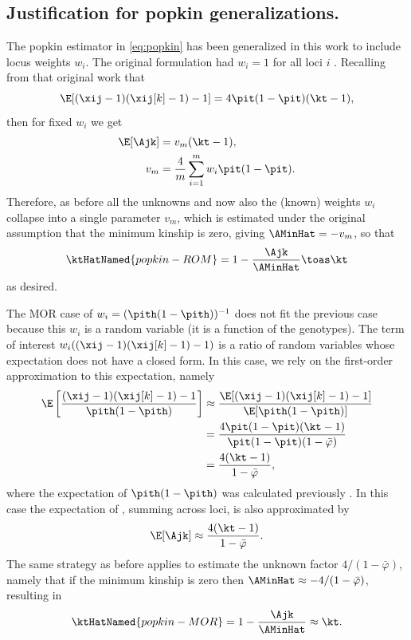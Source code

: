 \documentclass[11pt]{article}
\begin{document}
\printbibliography


\begin{appendices}
  \appendix

  \appendixpage
  
  \section{Justification for popkin generalizations.}

  \label{sec:popkin_w_justif}

  The popkin estimator in \cref{eq:popkin} has been generalized in this work to include locus weights $w_i$.
  The original formulation had $w_i=1$ for all loci $i$ \citep{ochoa_estimating_2021}.
  Recalling from that original work that
  $$
  \E[ (\xij-1)(\xij[k]-1) - 1 ] = 4 \pit ( 1 - \pit ) ( \kt - 1 ),
  $$
  then for fixed $w_i$ we get
  \begin{align*}
    \E[ \Ajk ]
    &=
      v_m ( \kt - 1 )
      , \\
    v_m
    &=
      \frac{4}{m} \sum_{i=1}^m w_i \pit ( 1 - \pit )
      .
  \end{align*}
  Therefore, as before all the unknowns \pit and now also the (known) weights $w_i$ collapse into a single parameter $v_m$, which is estimated under the original assumption that the minimum kinship is zero, giving $\AMinHat = -v_m$, so that
  $$
  \ktHatNamed{popkin-ROM}
  =
  1 - \frac{\Ajk}{\AMinHat}
  \toas
  \kt
  $$
  as desired.

  The MOR case of $w_i = (\pith (1-\pith))^{-1}$ does not fit the previous case because this $w_i$ is a random variable (it is a function of the genotypes).
  The term of interest $w_i ( (\xij-1)(\xij[k]-1) - 1 )$ is a ratio of random variables whose expectation does not have a closed form.
  In this case, we rely on the first-order approximation to this expectation, namely
  \begin{align*}
    \E \left[ \frac{ (\xij-1)(\xij[k]-1) - 1 }{ \pith (1-\pith) } \right]
    &\approx
      \frac{ \E[ (\xij-1)(\xij[k]-1) - 1 ] }{ \E[ \pith (1-\pith) ] }
    \\
    &=
      \frac{ 4 \pit ( 1 - \pit ) ( \kt - 1 ) }{ \pit (1-\pit) ( 1 - \bar{\varphi} ) }
    \\
    &=
      \frac{ 4 ( \kt - 1 ) }{ 1 - \bar{\varphi} }
  ,
  \end{align*}
  where the expectation of $\pith (1-\pith)$ was calculated previously \citep{ochoa_estimating_2021}.
  In this case the expectation of \Ajk, summing across loci, is also approximated by
  $$
  \E[ \Ajk ]
  \approx
  \frac{ 4 ( \kt - 1 ) }{ 1 - \bar{\varphi} }
  .
  $$
  The same strategy as before applies to estimate the unknown factor $4 / ( 1- \bar{\varphi} )$, namely that if the minimum kinship is zero then $\AMinHat \approx - 4 / ( 1- \bar{\varphi} )$, resulting in
  $$
  \ktHatNamed{popkin-MOR}
  =
  1 - \frac{\Ajk}{\AMinHat}
  \approx
  \kt
  .
  $$


\end{appendices}
\end{document}
